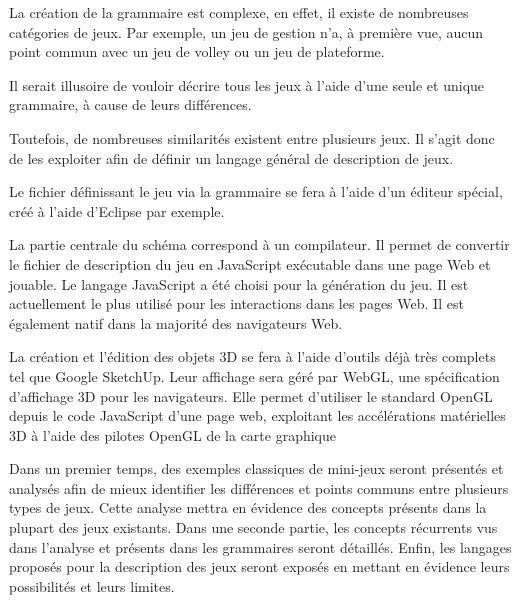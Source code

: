 La création de la grammaire est complexe, en effet, il existe de nombreuses catégories de jeux.
Par exemple, un jeu de gestion n'a, à première vue, aucun point commun avec un jeu de volley ou un jeu de plateforme.

Il serait illusoire de vouloir décrire tous les jeux à l'aide d'une seule et unique grammaire, à cause de leurs différences.

Toutefois, de nombreuses similarités existent entre plusieurs jeux. Il s'agit donc de les exploiter afin de définir un langage général de description de jeux.

Le fichier définissant le jeu via la grammaire se fera à l'aide d'un éditeur spécial, créé à l'aide d'Eclipse par exemple.

\vspace{0.5cm}

La partie centrale du schéma correspond à un compilateur.
Il permet de convertir le fichier de description du jeu en JavaScript exécutable dans une page Web et jouable.
Le langage JavaScript a été choisi pour la génération du jeu. Il est actuellement le plus utilisé pour les interactions dans les pages Web. Il est également natif dans la majorité des navigateurs Web.

La création et l'édition des objets 3D se fera à l'aide d'outils déjà très complets tel que Google SketchUp.
Leur affichage sera géré par WebGL, une spécification d'affichage 3D pour les navigateurs. 
Elle permet d'utiliser le standard OpenGL depuis le code JavaScript d'une page web, 
exploitant les accélérations matérielles 3D à l'aide des pilotes OpenGL de la carte graphique

\vspace{0.5cm}

Dans un premier temps, des exemples classiques de mini-jeux seront présentés et analysés afin de mieux identifier
les différences et points communs entre plusieurs types de jeux. Cette analyse mettra en évidence des concepts 
présents dans la plupart des jeux existants.
Dans une seconde partie, les concepts récurrents vus dans l'analyse et présents dans les grammaires seront détaillés.
Enfin, les langages proposés pour la description des jeux seront exposés en mettant en évidence leurs possibilités et leurs limites.